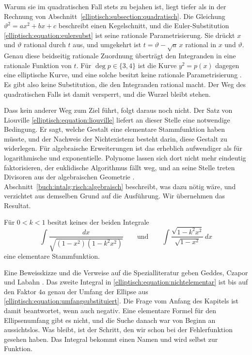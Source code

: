 Warum sie im quadratischen Fall stets zu bejahen ist, liegt tiefer
als in der Rechnung von
Abschnitt~\ref{elliptisch:subsection:quadratisch}.
Die Gleichung $\vartheta^2 = ax^2+bx+c$ beschreibt einen
Kegelschnitt, und die Euler-Substitution
\eqref{elliptisch:equation:eulersubst} ist seine rationale
Parametrisierung.
Sie drückt $x$ und $\vartheta$ rational durch $t$ aus, und umgekehrt
ist $t = \vartheta - \sqrt{a}\,x$ rational in $x$ und $\vartheta$.
Genau diese beidseitig rationale Zuordnung überträgt den
Integranden in eine rationale Funktion von $t$.
Für $\deg p \in \{3,4\}$ ist die Kurve $y^2 = p(x)$ dagegen eine
elliptische Kurve, und eine solche besitzt keine rationale
Parametrisierung \cite{elliptisch:geddes}.
%
Es gibt also keine Substitution, die den Integranden rational macht.
Der Weg des quadratischen Falls ist damit versperrt, und die Wurzel
bleibt stehen.

Dass kein anderer Weg zum Ziel führt, folgt daraus noch nicht.
Der Satz von Liouville
\eqref{elliptisch:equation:liouville} liefert an dieser Stelle eine
notwendige Bedingung.
Er sagt, welche Gestalt eine elementare Stammfunktion haben müsste,
und der Nachweis der Nichtexistenz besteht darin, diese Gestalt zu
widerlegen.
Für algebraische Erweiterungen ist das erheblich aufwendiger als für
logarithmische und exponentielle.
Polynome lassen sich dort nicht mehr eindeutig faktorisieren, der
euklidische Algorithmus fällt weg, und an seine Stelle treten
Divisoren aus der algebraischen Geometrie
\cite{elliptisch:geddes}.
Abschnitt~\ref{buch:intalg:risch:algebraisch} beschreibt, was dazu
nötig wäre, und verzichtet aus demselben Grund auf die Ausführung.
Wir übernehmen das Resultat.


\begin{satz}
\label{elliptisch:satz:nichtelementar}
Für $0 < k < 1$ besitzt keines der beiden Integrale
\begin{equation}
\int \frac{dx}{\sqrt{(1-x^2)(1-k^2x^2)}}
\qquad\text{und}\qquad
\int \frac{\sqrt{1-k^2x^2}}{\sqrt{1-x^2}}\,dx
\label{elliptisch:equation:nichtelementar}
\end{equation}
eine elementare Stammfunktion.
\end{satz}
Eine Beweisskizze und die Verweise auf die Spezialliteratur geben
Geddes, Czapor und Labahn \cite{elliptisch:geddes}.
Das zweite Integral in \eqref{elliptisch:equation:nichtelementar} ist
bis auf den Faktor $4a$ genau der Umfang der Ellipse aus
\eqref{elliptisch:equation:umfangsubstituiert}.
Die Frage vom Anfang des Kapitels ist damit beantwortet, wenn auch
negativ.
Eine elementare Formel für den Ellipsenumfang gibt es nicht, und die
Suche danach war von Beginn an aussichtslos.
Was bleibt, ist der Schritt, den wir schon bei der Fehlerfunktion
gesehen haben.
Das Integral bekommt einen Namen und wird selbst zur Funktion.
